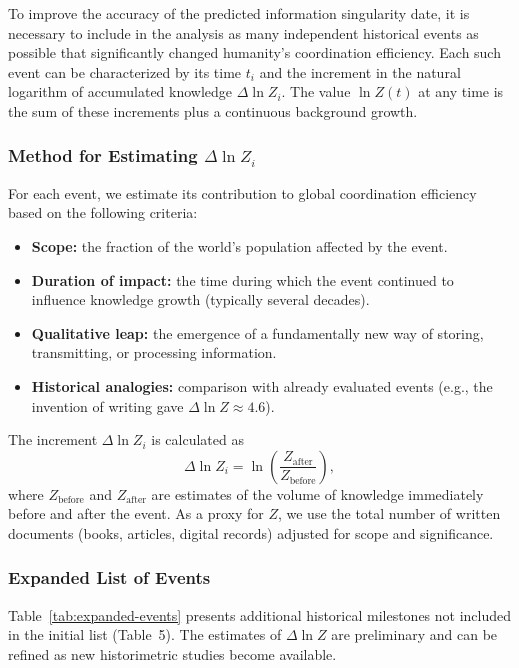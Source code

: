 \documentclass[12pt,a4paper]{article}
\theoremstyle{remark}
\begin{document}
	To improve the accuracy of the predicted information singularity date, it is necessary to include in the analysis as many independent historical events as possible that significantly changed humanity's coordination efficiency. Each such event can be characterized by its time \(t_i\) and the increment in the natural logarithm of accumulated knowledge \(\Delta \ln Z_i\). The value \(\ln Z(t)\) at any time is the sum of these increments plus a continuous background growth.
	
	\subsubsection{Method for Estimating \(\Delta \ln Z_i\)}
	
	For each event, we estimate its contribution to global coordination efficiency based on the following criteria:
	\begin{itemize}
		\item \textbf{Scope:} the fraction of the world's population affected by the event.
		\item \textbf{Duration of impact:} the time during which the event continued to influence knowledge growth (typically several decades).
		\item \textbf{Qualitative leap:} the emergence of a fundamentally new way of storing, transmitting, or processing information.
		\item \textbf{Historical analogies:} comparison with already evaluated events (e.g., the invention of writing gave \(\Delta \ln Z \approx 4.6\)).
	\end{itemize}
	The increment \(\Delta \ln Z_i\) is calculated as
	\[
	\Delta \ln Z_i = \ln\left(\frac{Z_{\text{after}}}{Z_{\text{before}}}\right),
	\]
	where \(Z_{\text{before}}\) and \(Z_{\text{after}}\) are estimates of the volume of knowledge immediately before and after the event. As a proxy for \(Z\), we use the total number of written documents (books, articles, digital records) adjusted for scope and significance.
	
	\subsubsection{Expanded List of Events}
	
	Table~\ref{tab:expanded-events} presents additional historical milestones not included in the initial list (Table~5). The estimates of \(\Delta \ln Z\) are preliminary and can be refined as new historimetric studies become available.
	
\end{document}

